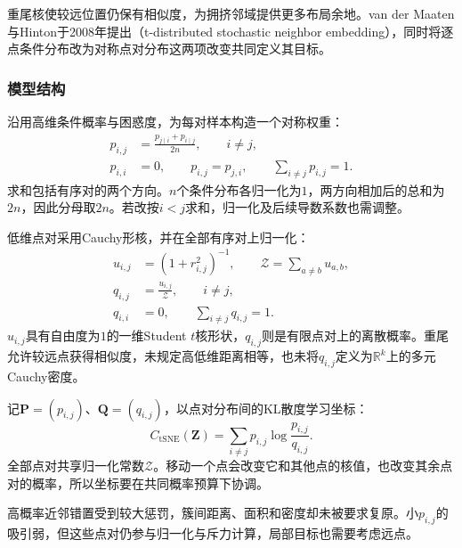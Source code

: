 重尾核使较远位置仍保有相似度，为拥挤邻域提供更多布局余地。van der Maaten与Hinton于2008年提出（t-distributed stochastic neighbor embedding），同时将逐点条件分布改为对称点对分布这两项改变共同定义其目标。

\subsubsection{模型结构}

沿用高维条件概率与困惑度，为每对样本构造一个对称权重：
\begin{equation}
  \label{eq:dim-tsne-joint}
  \begin{aligned}
    p_{i,j}&=\frac{p_{j\mid i}+p_{i\mid j}}{2n},\qquad i\ne j,\\
    p_{i,i}&=0,\qquad p_{i,j}=p_{j,i},\qquad
      \sum_{i\ne j}p_{i,j}=1.
  \end{aligned}
\end{equation}
求和包括有序对的两个方向。$n$个条件分布各归一化为$1$，两方向相加后的总和为$2n$，因此分母取$2n$。若改按$i<j$求和，归一化及后续导数系数也需调整。

低维点对采用Cauchy形核，并在全部有序对上归一化：
\begin{equation}
  \label{eq:dim-tsne-low}
  \begin{aligned}
    u_{i,j}&=(1+r_{i,j}^2)^{-1},\qquad
      \mathcal{Z}=\sum_{a\ne b}u_{a,b},\\
    q_{i,j}&=\frac{u_{i,j}}{\mathcal{Z}},\qquad i\ne j,\\
    q_{i,i}&=0,\qquad \sum_{i\ne j}q_{i,j}=1.
  \end{aligned}
\end{equation}
$u_{i,j}$具有自由度为$1$的一维Student $t$核形状，$q_{i,j}$则是有限点对上的离散概率。重尾允许较远点获得相似度，未规定高低维距离相等，也未将$q_{i,j}$定义为$\mathbb{R}^k$上的多元Cauchy密度。

记$\bm{P}=(p_{i,j})$、$\bm{Q}=(q_{i,j})$，以点对分布间的KL散度学习坐标：
\begin{equation}
  \label{eq:dim-tsne-loss}
  C_{\mathrm{tSNE}}(\bm{Z})
    =\sum_{i\ne j}p_{i,j}\log\frac{p_{i,j}}{q_{i,j}}.
\end{equation}
全部点对共享归一化常数$\mathcal{Z}$。移动一个点会改变它和其他点的核值，也改变其余点对的概率，所以坐标要在共同概率预算下协调。

高概率近邻错置受到较大惩罚，簇间距离、面积和密度却未被要求复原。小$p_{i,j}$的吸引弱，但这些点对仍参与归一化与斥力计算，局部目标也需要考虑远点。

